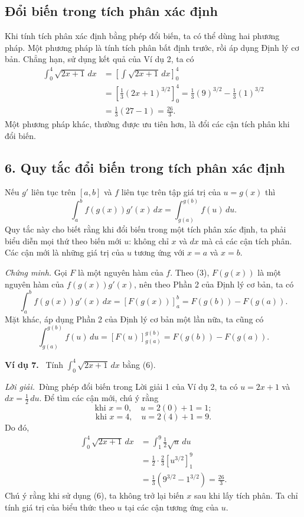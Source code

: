 \documentclass[12pt,a4paper]{article}
\newcommand{\ex}[1]{\par\medskip\noindent\textbf{Ví dụ #1.}\ }
\newcommand{\sol}{\par\nopagebreak[4]\noindent\textit{Lời giải.}\ }
\begin{document}
\subsection*{Đổi biến trong tích phân xác định}
Khi tính tích phân xác định bằng phép đổi biến, ta có thể dùng hai phương pháp. Một phương pháp là tính tích phân bất định trước, rồi áp dụng Định lý cơ bản. Chẳng hạn, sử dụng kết quả của Ví dụ 2, ta có
\begin{align*}
\int_0^4\sqrt{2x+1}\,dx
&=\left[\int\sqrt{2x+1}\,dx\right]_0^4\\
&=\left[\frac13(2x+1)^{3/2}\right]_0^4
=\frac13(9)^{3/2}-\frac13(1)^{3/2}\\
&=\frac13(27-1)=\frac{26}{3}.
\end{align*}
Một phương pháp khác, thường được ưu tiên hơn, là đổi các cận tích phân khi đổi biến.

\subsection*{6. Quy tắc đổi biến trong tích phân xác định}
Nếu $g'$ liên tục trên $[a,b]$ và $f$ liên tục trên tập giá trị của $u=g(x)$ thì
\[\boxed{\displaystyle\int_a^b f(g(x))g'(x)\,dx=\int_{g(a)}^{g(b)}f(u)\,du.}\]
Quy tắc này cho biết rằng khi đổi biến trong một tích phân xác định, ta phải biểu diễn mọi thứ theo biến mới $u$: không chỉ $x$ và $dx$ mà cả các cận tích phân. Các cận mới là những giá trị của $u$ tương ứng với $x=a$ và $x=b$.

\par\noindent\textit{Chứng minh.} Gọi $F$ là một nguyên hàm của $f$. Theo (3), $F(g(x))$ là một nguyên hàm của $f(g(x))g'(x)$, nên theo Phần 2 của Định lý cơ bản, ta có
\[
\int_a^b f(g(x))g'(x)\,dx=[F(g(x))]_a^b=F(g(b))-F(g(a)).
\]
Mặt khác, áp dụng Phần 2 của Định lý cơ bản một lần nữa, ta cũng có
\[\int_{g(a)}^{g(b)}f(u)\,du=[F(u)]_{g(a)}^{g(b)}=F(g(b))-F(g(a)).\]

\ex{7} Tính $\displaystyle\int_0^4\sqrt{2x+1}\,dx$ bằng (6).
\sol Dùng phép đổi biến trong Lời giải 1 của Ví dụ 2, ta có $u=2x+1$ và $dx=\frac12\,du$. Để tìm các cận mới, chú ý rằng
\[
\text{khi }x=0,\quad u=2(0)+1=1;
\]
\[
\text{khi }x=4,\quad u=2(4)+1=9.
\]
Do đó,
\begin{align*}
\int_0^4\sqrt{2x+1}\,dx&=\int_1^9\frac12\sqrt u\,du\\
&=\frac12\cdot\frac23\left[u^{3/2}\right]_1^9\\
&=\frac13(9^{3/2}-1^{3/2})=\frac{26}{3}.
\end{align*}
Chú ý rằng khi sử dụng (6), ta không trở lại biến $x$ sau khi lấy tích phân. Ta chỉ tính giá trị của biểu thức theo $u$ tại các cận tương ứng của $u$.
\end{document}
